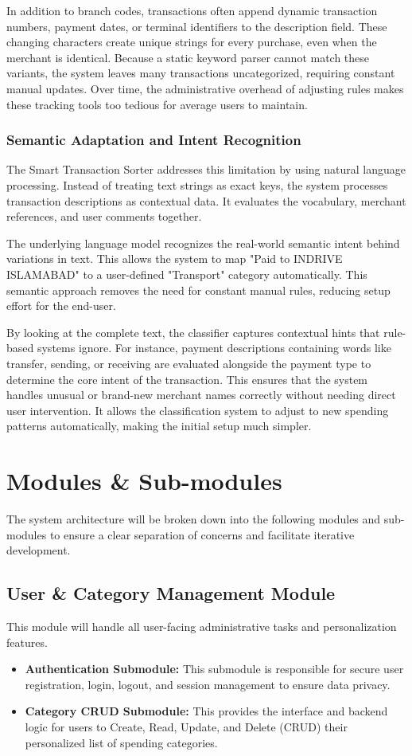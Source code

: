 In addition to branch codes, transactions often append dynamic transaction numbers, payment dates, or terminal identifiers to the description field. These changing characters create unique strings for every purchase, even when the merchant is identical. Because a static keyword parser cannot match these variants, the system leaves many transactions uncategorized, requiring constant manual updates. Over time, the administrative overhead of adjusting rules makes these tracking tools too tedious for average users to maintain.

\subsubsection{Semantic Adaptation and Intent Recognition}
The Smart Transaction Sorter addresses this limitation by using natural language processing. Instead of treating text strings as exact keys, the system processes transaction descriptions as contextual data. It evaluates the vocabulary, merchant references, and user comments together.

The underlying language model recognizes the real-world semantic intent behind variations in text. This allows the system to map "Paid to INDRIVE ISLAMABAD" to a user-defined "Transport" category automatically. This semantic approach removes the need for constant manual rules, reducing setup effort for the end-user.

By looking at the complete text, the classifier captures contextual hints that rule-based systems ignore. For instance, payment descriptions containing words like transfer, sending, or receiving are evaluated alongside the payment type to determine the core intent of the transaction. This ensures that the system handles unusual or brand-new merchant names correctly without needing direct user intervention. It allows the classification system to adjust to new spending patterns automatically, making the initial setup much simpler.

\section{Modules \& Sub-modules}
The system architecture will be broken down into the following modules and sub-modules to ensure a clear separation of concerns and facilitate iterative development.

\subsection{User \& Category Management Module}
This module will handle all user-facing administrative tasks and personalization features.
\begin{itemize}
	\item \textbf{Authentication Submodule:} This submodule is responsible for secure user registration, login, logout, and session management to ensure data privacy.
	\item \textbf{Category CRUD Submodule:} This provides the interface and backend logic for users to Create, Read, Update, and Delete (CRUD) their personalized list of spending categories.
\end{itemize}

